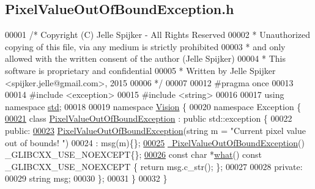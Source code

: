\hypertarget{_pixel_value_out_of_bound_exception_8h_source}{}\subsection{Pixel\+Value\+Out\+Of\+Bound\+Exception.\+h}
\label{_pixel_value_out_of_bound_exception_8h_source}

\begin{DoxyCode}
00001 \textcolor{comment}{/* Copyright (C) Jelle Spijker - All Rights Reserved}
00002 \textcolor{comment}{ * Unauthorized copying of this file, via any medium is strictly prohibited}
00003 \textcolor{comment}{ * and only allowed with the written consent of the author (Jelle Spijker)}
00004 \textcolor{comment}{ * This software is proprietary and confidential}
00005 \textcolor{comment}{ * Written by Jelle Spijker <spijker.jelle@gmail.com>, 2015}
00006 \textcolor{comment}{ */}
00007 
00012 \textcolor{preprocessor}{#pragma once}
00013 
00014 \textcolor{preprocessor}{#include <exception>}
00015 \textcolor{preprocessor}{#include <string>}
00016 
00017 \textcolor{keyword}{using namespace }\hyperlink{namespacestd}{std};
00018 
00019 \textcolor{keyword}{namespace }\hyperlink{namespace_vision}{Vision} \{
00020 \textcolor{keyword}{namespace }Exception \{
\hypertarget{_pixel_value_out_of_bound_exception_8h_source_l00021}{}\hyperlink{class_vision_1_1_exception_1_1_pixel_value_out_of_bound_exception}{00021} \textcolor{keyword}{class }\hyperlink{class_vision_1_1_exception_1_1_pixel_value_out_of_bound_exception}{PixelValueOutOfBoundException} : \textcolor{keyword}{public} std::exception \{
00022 \textcolor{keyword}{public}:
\hypertarget{_pixel_value_out_of_bound_exception_8h_source_l00023}{}\hyperlink{class_vision_1_1_exception_1_1_pixel_value_out_of_bound_exception_aabf807476a795d143fb01d076a2c1482}{00023}   \hyperlink{class_vision_1_1_exception_1_1_pixel_value_out_of_bound_exception_aabf807476a795d143fb01d076a2c1482}{PixelValueOutOfBoundException}(\textcolor{keywordtype}{string} m = \textcolor{stringliteral}{"Current pixel value out of bounds!
      "})
00024       : msg(m)\{\};
\hypertarget{_pixel_value_out_of_bound_exception_8h_source_l00025}{}\hyperlink{class_vision_1_1_exception_1_1_pixel_value_out_of_bound_exception_abf1093cf72cf8d1ac5beaee754d68ebc}{00025}   \hyperlink{class_vision_1_1_exception_1_1_pixel_value_out_of_bound_exception_abf1093cf72cf8d1ac5beaee754d68ebc}{~PixelValueOutOfBoundException}() \_GLIBCXX\_USE\_NOEXCEPT\{\};
\hypertarget{_pixel_value_out_of_bound_exception_8h_source_l00026}{}\hyperlink{class_vision_1_1_exception_1_1_pixel_value_out_of_bound_exception_a7f72688e1cf7271481dfe9dd591f1d2c}{00026}   \textcolor{keyword}{const} \textcolor{keywordtype}{char} *\hyperlink{class_vision_1_1_exception_1_1_pixel_value_out_of_bound_exception_a7f72688e1cf7271481dfe9dd591f1d2c}{what}() const \_GLIBCXX\_USE\_NOEXCEPT \{ \textcolor{keywordflow}{return} msg.c\_str(); \};
00027 
00028 \textcolor{keyword}{private}:
00029   \textcolor{keywordtype}{string} msg;
00030 \};
00031 \}
00032 \}
\end{DoxyCode}
